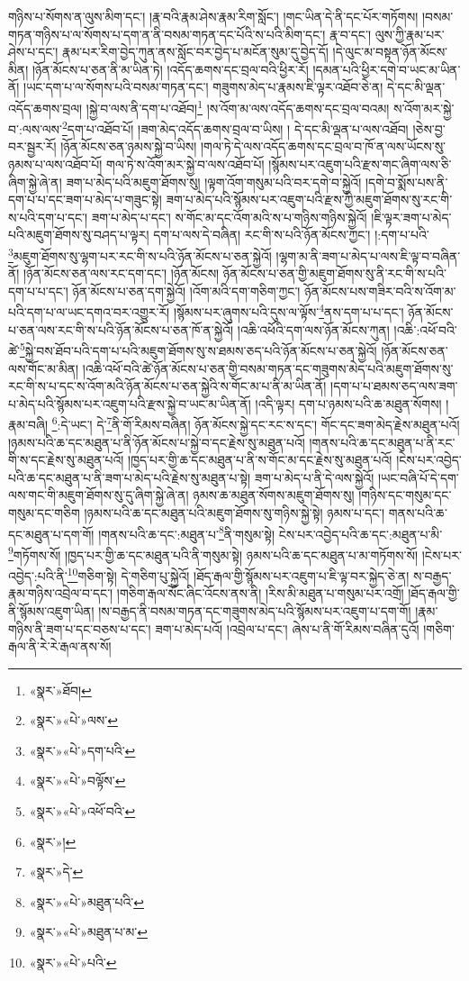 གཉིས་པ་སོགས་ན་ལུས་མིག་དང་། །རྣ་བའི་རྣམ་ཤེས་རྣམ་རིག་སློང་། །གང་ཡིན་དེ་ནི་དང་པོར་གཏོགས། །བསམ་གཏན་གཉིས་པ་ལ་སོགས་པ་དག་ན་ནི་བསམ་གཏན་དང་པོའི་ས་པའི་མིག་དང་། རྣ་བ་དང་། ལུས་ཀྱི་རྣམ་པར་ཤེས་པ་དང་། རྣམ་པར་རིག་བྱེད་ཀུན་ནས་སློང་བར་བྱེད་པ་མངོན་སུམ་དུ་བྱེད་དོ། །དེ་ལུང་མ་བསྟན་ཉོན་མོངས་མིན། །ཉོན་མོངས་པ་ཅན་ནི་མ་ཡིན་ཏེ། །འདོད་ཆགས་དང་བྲལ་བའི་ཕྱིར་རོ། །དམན་པའི་ཕྱིར་དགེ་བ་ཡང་མ་ཡིན་ནོ། །ཡང་དག་པ་ལ་སོགས་པའི་བསམ་གཏན་དང་། གཟུགས་མེད་པ་རྣམས་ཇི་ལྟར་འཐོབ་ཅེ་ན། དེ་དང་མི་ལྡན་འདོད་ཆགས་བྲལ། །སྐྱེ་བ་ལས་ནི་དག་པ་འཐོབ།\footnote{«སྣར་»ཐོབ།} །ས་འོག་མ་ལས་འདོད་ཆགས་དང་བྲལ་བའམ། ས་འོག་མར་སྐྱེ་བ་:ལས་ལས་\footnote{«སྣར་»«པེ་»ལས་}དག་པ་འཐོབ་པོ། །ཟག་མེད་འདོད་ཆགས་བྲལ་བ་ཡིས། །
དེ་དང་མི་ལྡན་པ་ལས་འཐོབ། །ཅེས་བྱ་བར་སྦྱར་རོ། །ཉོན་མོངས་ཅན་ཉམས་སྐྱེ་བ་ཡིས། །གལ་ཏེ་དེ་ལས་འདོད་ཆགས་དང་བྲལ་བ་ཁོ་ན་ལས་ཡོངས་སུ་ཉམས་པ་ལས་འཐོབ་པོ། གལ་ཏེ་ས་འོག་མར་སྐྱེ་བ་ལས་འཐོབ་པོ། །སྙོམས་པར་འཇུག་པའི་རྫས་གང་ཞིག་ལས་ཅི་ཞིག་སྐྱེ་ཞེ་ན། ཟག་པ་མེད་པའི་མཇུག་ཐོགས་སུ། །ལྟག་འོག་གསུམ་པའི་བར་དགེ་བ་སྐྱེའོ། །དགེ་བ་སྨོས་པས་ནི་དག་པ་པ་དང་ཟག་པ་མེད་པ་གཟུང་སྟེ། ཟག་པ་མེད་པའི་སྙོམས་པར་འཇུག་པའི་རྫས་ཀྱི་མཇུག་ཐོགས་སུ་རང་གི་ས་པའི་དག་པ་དང་། ཟག་པ་མེད་པ་དང་། ས་གོང་མ་དང་འོག་མའི་ས་པ་གཉིས་གཉིས་སྐྱེའོ། །ཇི་ལྟར་ཟག་པ་མེད་པའི་མཇུག་ཐོགས་སུ་བཤད་པ་ལྟར། དག་པ་ལས་དེ་བཞིན། རང་གི་ས་པའི་ཉོན་མོངས་ཀྱང་། །:དག་པ་པའི་\footnote{«སྣར་»«པེ་»དག་པའི་}མཇུག་ཐོགས་སུ་ལྷག་པར་རང་གི་ས་པའི་ཉོན་མོངས་པ་ཅན་སྐྱེའོ། །ལྷག་མ་ནི་ཟག་པ་མེད་པ་ལས་ཇི་ལྟ་བ་བཞིན་ནོ། །ཉོན་མོངས་ཅན་ལས་རང་དག་དང་། །ཉོན་མོངས། ཉོན་མོངས་པ་ཅན་གྱི་མཇུག་ཐོགས་སུ་ནི་རང་གི་ས་པའི་དག་པ་པ་དང་། ཉོན་མོངས་པ་ཅན་དག་སྐྱེའོ། །འོག་མའི་དག་གཅིག་ཀྱང་། ཉོན་མོངས་པས་གཟིར་བའི་ས་འོག་མ་པའི་དག་པ་ལ་ཡང་དགའ་བར་འགྱུར་རོ། །སྙོམས་པར་ཞུགས་པའི་དུས་ལ་ལྟོས་\footnote{«སྣར་»«པེ་»བལྟོས་}ནས་དག་པ་པ་དང་། ཉོན་མོངས་པ་ཅན་ལས་རང་གི་ས་པའི་ཉོན་མོངས་པ་ཅན་ཁོ་ན་སྐྱེའོ། །འཆི་འཕོའི་དག་ལས་ཉོན་མོངས་ཀུན། །འཆི་:འཕོ་བའི་ཚེ་\footnote{«སྣར་»«པེ་»འཕོ་བའི་}སྐྱེ་བས་ཐོབ་པའི་དག་པ་པའི་མཇུག་ཐོགས་སུ་ས་ཐམས་ཅད་པའི་ཉོན་མོངས་པ་ཅན་སྐྱེའོ། །ཉོན་མོངས་ཅན་ལས་གོང་མ་མིན། །འཆི་འཕོ་བའི་ཚེ་ཉོན་མོངས་པ་ཅན་གྱི་བསམ་གཏན་དང་གཟུགས་མེད་པའི་མཇུག་ཐོགས་སུ་རང་གི་ས་པ་དང་ས་འོག་མའི་ཉོན་མོངས་པ་ཅན་སྐྱེའི་ས་གོང་མ་པ་ནི་མ་ཡིན་ནོ། །དག་པ་པ་ཐམས་ཅད་ལས་ཟག་པ་མེད་པའི་སྙོམས་པར་འཇུག་པའི་རྫས་སྐྱེ་བ་ཡང་མ་ཡིན་ནོ། །འདི་ལྟར། དག་པ་ཉམས་པའི་ཆ་མཐུན་སོགས། །རྣམ་བཞི། \footnote{«སྣར་»།  }:དེ་ཡང་། དེ་\footnote{«སྣར་»དེ་}ནི་གོ་རིམས་བཞིན། ཉོན་མོངས་སྐྱེ་དང་རང་ས་དང་། གོང་དང་ཟག་མེད་རྗེས་མཐུན་པའོ། །ཉམས་པའི་ཆ་དང་མཐུན་པ་ནི་ཉོན་མོངས་པ་སྐྱེ་བ་དང་རྗེས་སུ་མཐུན་པའོ། །གནས་པའི་ཆ་དང་མཐུན་པ་ནི་རང་གི་ས་དང་རྗེས་སུ་མཐུན་པའོ། །ཁྱད་པར་གྱི་ཆ་དང་མཐུན་པ་ནི་ས་གོང་མ་དང་རྗེས་སུ་མཐུན་པའོ། །ངེས་པར་འབྱེད་པའི་ཆ་དང་མཐུན་པ་ནི་ཟག་པ་མེད་པའི་རྗེས་སུ་མཐུན་པ་སྟེ། ཟག་པ་མེད་པ་ནི་དེ་ལས་སྐྱེའོ། །ཡང་བཞི་པོ་དེ་དག་ལས་གང་གི་མཇུག་ཐོགས་སུ་དུ་ཞིག་སྐྱེ་ཞེ་ན། ཉམས་ཆ་མཐུན་སོགས་མཇུག་ཐོགས་སུ། །གཉིས་དང་གསུམ་དང་གསུམ་དང་གཅིག །ཉམས་པའི་ཆ་དང་མཐུན་པའི་མཇུག་ཐོགས་སུ་གཉིས་སྐྱེ་སྟེ། ཉམས་པ་དང་། གནས་པའི་ཆ་དང་མཐུན་པ་དག་གོ། །གནས་པའི་ཆ་དང་:མཐུན་པ་\footnote{«སྣར་»«པེ་»མཐུན་པའི་}ནི་གསུམ་སྟེ། ངེས་པར་འབྱེད་པའི་ཆ་དང་:མཐུན་པ་མི་\footnote{«སྣར་»«པེ་»མཐུན་པ་མ་}གཏོགས་སོ། །ཁྱད་པར་གྱི་ཆ་དང་མཐུན་པའི་ནི་གསུམ་སྟེ། ཉམས་པའི་ཆ་དང་མཐུན་པ་མ་གཏོགས་སོ། །ངེས་པར་འབྱེད་:པའི་ནི་\footnote{«སྣར་»«པེ་»པའི་}གཅིག་སྟེ། དེ་གཅིག་པུ་སྐྱེའོ། །ཐོད་རྒལ་གྱི་སྙོམས་པར་འཇུག་པ་ཇི་ལྟ་བར་སྐྱེད་ཅེ་ན། ས་བརྒྱད་རྣམ་གཉིས་འབྲེལ་བ་དང་། །གཅིག་རྒལ་སོང་ཞིང་འོངས་ནས་ནི། །རིས་མི་མཐུན་པ་གསུམ་པར་འགྲོ། །ཐོད་རྒལ་གྱི་ནི་སྙོམས་འཇུག་ཡིན། །ས་བརྒྱད་ནི་བསམ་གཏན་དང་གཟུགས་མེད་པའི་སྙོམས་པར་འཇུག་པ་དག་གོ། །རྣམ་གཉིས་ནི་ཟག་པ་དང་བཅས་པ་དང་། ཟག་པ་མེད་པའོ། །འབྲེལ་པ་དང་། ཞེས་པ་ནི་གོ་རིམས་བཞིན་དུའོ། །གཅིག་རྒལ་ནི་རེ་རེ་རྒལ་ནས་སོ། 